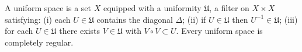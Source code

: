 A uniform space is a set $X$ equipped with a uniformity $\mathfrak{U}$, a filter on $X \times X$ satisfying: (i) each $U \in \mathfrak{U}$ contains the diagonal $\Delta$; (ii) if $U \in \mathfrak{U}$ then $U^{-1} \in \mathfrak{U}$; (iii) for each $U \in \mathfrak{U}$ there exists $V \in \mathfrak{U}$ with $V \circ V \subset U$. Every uniform space is completely regular.
